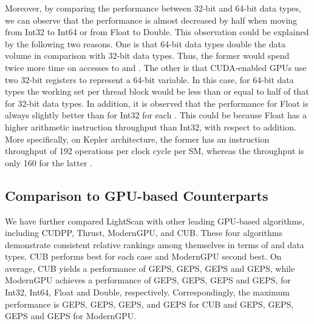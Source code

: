 \documentclass[article]{elsarticle}
\renewcommand{\hl}[1]{#1}
\begin{document}
{Moreover, by comparing the performance between 32-bit and 64-bit data types, we can observe that the performance is almost decreased by half when moving from Int32 to Int64 or from Float to Double. \hl{This observation could be explained by the following two reasons. One is that 64-bit data types double the data volume in comparison with 32-bit data types. Thus, the former would spend twice more time on accesses to  and . The other is that CUDA-enabled GPUs use two 32-bit registers to represent a 64-bit variable. In this case, for 64-bit data types the working set per thread block would be less than or equal to half of that for 32-bit data types.} In addition, it is observed that the performance for Float is always slightly better than for Int32 for each . This could be because Float has a higher arithmetic instruction throughput than Int32, with respect to addition. More specifically, on Kepler architecture, the former has an instruction throughput of 192 operations per clock cycle per SM, whereas the throughput is only 160 for the latter \cite{cudacprogramming}.
\subsection{Comparison to GPU-based Counterparts}
\label{sec:results_gpu}
We have further compared LightScan with other leading GPU-based algorithms, including CUDPP, Thrust, ModernGPU, and CUB. These four algorithms demonstrate consistent relative rankings among themselves in terms of  and data types. CUB performs best for each case and ModernGPU second best. On average, CUB yields a performance of  GEPS,  GEPS,  GEPS and  GEPS, while ModernGPU achieves a performance of  GEPS,  GEPS,  GEPS and  GEPS, for Int32, Int64, Float and Double, respectively. Correspondingly, the maximum performance is  GEPS,  GEPS,  GEPS, and  GEPS for CUB and  GEPS,  GEPS,  GEPS and  GEPS for ModernGPU.

}
\end{document}
